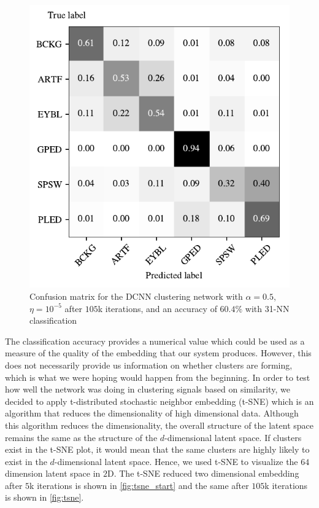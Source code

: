 \begin{figure}[!ht]
	\centering
	\includegraphics[width=0.55\linewidth]{pictures/conf_mat_exp.pdf}
	\caption[Confusion matrix for the DCNN clustering network]{Confusion matrix for the DCNN clustering network with $\alpha = 0.5$, $\eta = 10^{-5}$ after $105$k iterations, and an accuracy of $60.4\%$ with 31-NN classification}\label{fig:dcnnlarge}
\end{figure}

The classification accuracy provides a numerical value which could be used as a measure of the quality of the embedding that our system produces. However, this does not necessarily provide us information on whether clusters are forming, which is what we were hoping would happen from the beginning. In order to test how well the network was doing in clustering signals based on similarity, we decided to apply t-distributed stochastic neighbor embedding  (t-SNE) which is an algorithm that reduces the dimensionality of high dimensional data. Although this algorithm reduces the dimensionality, the overall structure of the latent space remains the same as the structure of the $d$-dimensional latent space. If clusters exist in the t-SNE plot, it would mean that the same clusters are highly likely to exist in the $d$-dimensional latent space. Hence, we used t-SNE to visualize the $64$ dimension latent space in $2$D. The t-SNE reduced two dimensional embedding after $5$k iterations is shown in \cref{fig:tsne_start} and the same after $105$k iterations is shown in \cref{fig:tsne}. 

